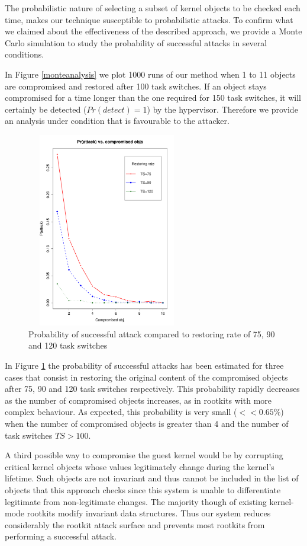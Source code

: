 The probabilistic nature of selecting a subset of kernel objects to be checked each time, makes our technique susceptible to probabilistic attacks. 
To confirm what we claimed about the effectiveness of the described approach, we provide a Monte Carlo simulation to study the probability of successful attacks in several conditions. 

In Figure \ref{monteanalysis} we plot 1000 runs of our method when 1 to 11 objects are compromised and restored after 100 task switches. If an object stays compromised for a time longer than the one required for 150 task switches, it will certainly be detected ($Pr(detect)=1$) by the hypervisor. Therefore we provide an analysis under condition that is favourable to the attacker.  

\begin{figure}[!htbp]
\begin{center}
\includegraphics[width=70mm, height=85mm]{images/hr_sim_1000_ts}
\caption{{Probability of successful attack compared to restoring rate of 75, 90 and 120 task switches}}
\label{probts}
\end{center}
\end{figure}

In Figure \ref{probts} the probability of successful attacks has been estimated for three cases that consist in restoring the original content of the compromised objects after 75, 90 and 120 task switches respectively. This probability rapidly decreases as the number of compromised objects increases, as in rootkits with more complex behaviour. 
As expected, this probability is very small ($<< 0.65\%$) when the number of compromised objects is greater than 4 and the number of task switches $TS>100$.

A third possible way to compromise the guest kernel would be by corrupting critical kernel objects whose values legitimately change during the kernel's lifetime. Such objects are not invariant and thus cannot  be included in the list of objects that this approach checks since this system is unable to differentiate legitimate from non-legitimate changes. The majority though of existing kernel-mode rootkits modify invariant data structures. Thus our system reduces considerably the rootkit attack surface and prevents most rootkits from performing a successful attack.

